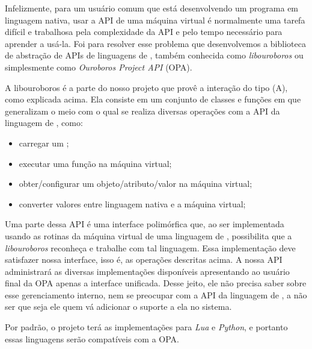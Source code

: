     Infelizmente, para um usuário comum que está desenvolvendo um programa em
    linguagem nativa, usar a API de uma máquina virtual é normalmente uma tarefa
    difícil e trabalhosa pela complexidade da API e pelo tempo necessário para
    aprender a usá-la. Foi para resolver esse problema que desenvolvemos a
    biblioteca de abstração de APIs de linguagens de \script{}, também conhecida
    como \textit{libouroboros} ou simplesmente como \emph{Ouroboros Project API}
    (OPA).
    
    A libouroboros é a parte do nosso projeto que provê a interação do tipo (A),
    como explicada acima. Ela consiste em um conjunto de classes e funções em 
    \CXX{} que generalizam o meio com o qual se realiza diversas operações com 
    a API da linguagem de \script{}, como:
    \begin{itemize}
      \item carregar um \script{};
      \item executar uma função na máquina virtual;
      \item obter/configurar um objeto/atributo/valor na máquina virtual;
      \item converter valores entre linguagem nativa e a máquina virtual;
    \end{itemize}
    Uma parte dessa API é uma interface polimórfica que, ao ser implementada usando
    as rotinas da máquina virtual de uma linguagem de \script{}, possibilita que
    a \emph{libouroboros} reconheça e trabalhe com tal linguagem. Essa
    implementação deve satisfazer nossa interface, isso é, as operações
    descritas acima. A nossa API administrará as diversas implementações
    disponíveis apresentando ao usuário final da OPA apenas a interface
    unificada. Desse jeito, ele não precisa saber sobre esse gerenciamento
    interno, nem se preocupar com a API da linguagem de \script{}, a não ser que
    seja ele quem vá adicionar o suporte a ela no sistema.

    
    Por padrão, o projeto terá as implementações para \textit{Lua} e
    \textit{Python}, e portanto essas linguagens serão compatíveis com a OPA.
    
  
